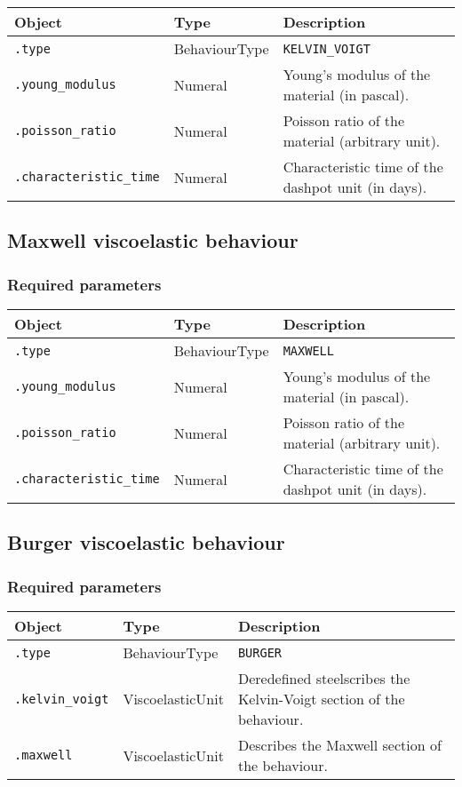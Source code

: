 \documentclass[10pt]{article}
\begin{document}
\begin{tabularx}{\textwidth}{llX}
\hline 
Object & Type & Description \\ 
\hline 
\verb+.type+ & BehaviourType & \verb+KELVIN_VOIGT+ \\ 
\verb+.young_modulus+ & Numeral & Young's modulus of the material (in pascal). \\ 
\verb+.poisson_ratio+ & Numeral & Poisson ratio of the material (arbitrary unit). \\ 
\verb+.characteristic_time+ & Numeral & Characteristic time of the dashpot unit (in days). \\ 
\hline 
\end{tabularx}

\subsection{Maxwell viscoelastic behaviour}

\subsubsection*{Required parameters}

\begin{tabularx}{\textwidth}{llX}
\hline 
Object & Type & Description \\ 
\hline 
\verb+.type+ & BehaviourType & \verb+MAXWELL+ \\ 
\verb+.young_modulus+ & Numeral & Young's modulus of the material (in pascal). \\ 
\verb+.poisson_ratio+ & Numeral & Poisson ratio of the material (arbitrary unit). \\ 
\verb+.characteristic_time+ & Numeral & Characteristic time of the dashpot unit (in days). \\ 
\hline 
\end{tabularx}

\subsection{Burger viscoelastic behaviour}

\subsubsection*{Required parameters}

\begin{tabularx}{\textwidth}{llX}
\hline 
Object & Type & Description \\ 
\hline 
\verb+.type+ & BehaviourType & \verb+BURGER+ \\ 
\verb+.kelvin_voigt+ & ViscoelasticUnit & Deredefined steelscribes the Kelvin-Voigt section of the behaviour. \\ 
\verb+.maxwell+ & ViscoelasticUnit & Describes the Maxwell section of the behaviour. \\ 
\hline 
\end{tabularx}
\end{document}
